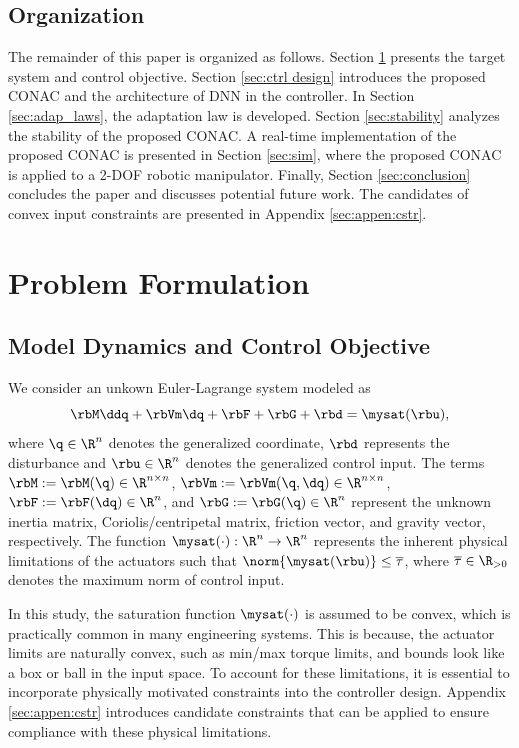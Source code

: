 \documentclass[journal]{IEEEtran}
\begin{document}
\subsection{Organization}

The remainder of this paper is organized as follows. 
Section \ref{sec:Problem Formulation} presents the target system and control objective.
Section \ref{sec:ctrl design} introduces the proposed CONAC and the architecture of DNN in the controller. 
In Section \ref{sec:adap_laws}, the adaptation law is developed.
Section \ref{sec:stability} analyzes the stability of the proposed CONAC.
A real-time implementation of the proposed CONAC is presented in Section \ref{sec:sim}, where the proposed CONAC is applied to a 2-DOF robotic manipulator.
Finally, Section \ref{sec:conclusion} concludes the paper and discusses potential future work.
The candidates of convex input constraints are presented in Appendix \ref{sec:appen:cstr}. 

\section{Problem Formulation}\label{sec:Problem Formulation}

\subsection{Model Dynamics and Control Objective}

We consider an \color{red}unkown\color{black} Euler-Lagrange system modeled as
\begin{equation}
    \rbM\ddq +\rbVm \dq+ \rbF + \rbG + \rbd
    =
    \mysat(\rbu)
    ,
    \label{eq:sys1}
\end{equation}
where $\q\in \R^n$ denotes the generalized coordinate, $\rbd$ represents the disturbance and $\rbu\in\R^n$ denotes the generalized control input. 
The terms $\rbM:=\rbM(\q)\in\R^{n\times n}$, $\rbVm:=\rbVm(\q,\dq)\in\R^{n\times n}$, $\rbF:=\rbF(\dq)\in\R^{n}$, and $\rbG:=\rbG(\q)\in\R^{n}$ represent the unknown inertia matrix, Coriolis/centripetal matrix, friction vector, and gravity vector, respectively.
The function $\mysat(\cdot):\R^n\to\R^n$ represents the inherent physical limitations of the actuators such that $\norm{\mysat(\rbu)}\le \overline\tau$, where $\overline\tau\in\R_{>0}$ denotes the maximum norm of control input.

In this study, the saturation function $\mysat(\cdot)$ is assumed to be convex, which is practically common in many engineering systems.
This is because, the actuator limits are naturally convex, such as min/max torque limits, and bounds look like a box or ball in the input space.
To account for these limitations, it is essential to incorporate physically motivated constraints into the controller design.
Appendix \ref{sec:appen:cstr} introduces candidate constraints that can be applied to ensure compliance with these physical limitations.
\end{document}
